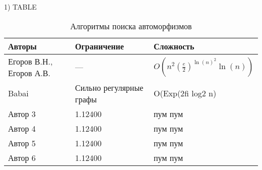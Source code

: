 1) TABLE


\begin{table}[h]
\centering
\begin{tabular}[t]{|l|l|l|}
\hline
\textbf{Авторы} & \textbf{Ограничение} & \textbf{Сложность}\\
\hline
Егоров В.Н., Егоров А.В. \cite{ArtMain_Egorov} & --- & $O(n^2(\frac{e}{2})^{\ln(n)^2} \ln(n))$\\
\hline
Babai \cite{ArtSrg_Babai}& Сильно регулярные графы & O(Exp(2fi log2 n)\\
\hline
Автор 3 & 1.12400 & пум пум\\
\hline
Автор 4 & 1.12400 & пум пум\\
\hline
Автор 5 & 1.12400 & пум пум\\
\hline
Автор 6 & 1.12400 & пум пум\\
\hline
\end{tabular}
\caption{Алгоритмы поиска автоморфизмов}
\label{tabular:algos}
\end{table}
